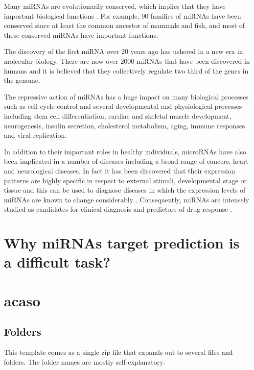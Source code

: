 Many miRNAs are evolutionarily conserved, which implies that they have important biological functions \cite{conserved_pairing}. For example, 90 families of miRNAs have been conserved since at least the common ancestor of mammals and fish, and most of these conserved miRNAs have important functions.

The discovery of the first miRNA over 20 years ago has ushered in a new era in molecular biology. There are now over 2000 miRNAs that have been discovered in humans and it is believed that they collectively regulate two third of the genes in the genome.

The repressive action of miRNAs has a huge impact on many biological processes such as cell cycle control and several developmental and physiological processes including stem cell differentiation, cardiac and skeletal muscle development, neurogenesis, insulin secretion, cholesterol metabolism, aging, immune responses and viral replication. \cite{mirna_annotation}

In addition to their important roles in healthy individuals, microRNAs have also been implicated in a number of diseases including a broad range of cancers, heart and neurological diseases.  In fact it has been discovered that their expression patterns  are highly specific in respect to external stimuli, developmental stage or tissue and this can be used to diagnose diseases in which the expression levels of miRNAs are known to change considerably \cite{computational_methods}. Consequently, miRNAs are intensely studied as candidates for clinical diagnosis and predictors of drug response \cite{mirna_diseases}.

\section{Why miRNAs target prediction is a difficult task?}




\section{acaso}

\subsection{Folders}

This template comes as a single zip file that expands out to several files and folders. The folder names are mostly self-explanatory:


